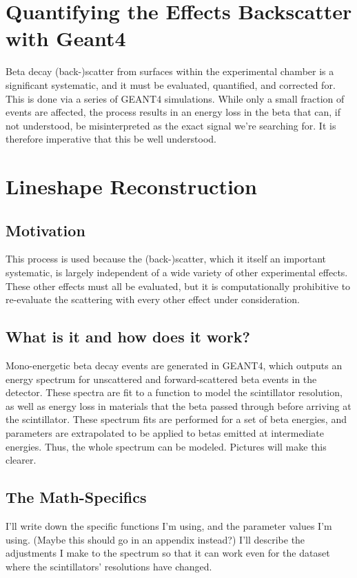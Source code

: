 \section{Quantifying the Effects Backscatter with Geant4}
	Beta decay (back-)scatter from surfaces within the experimental chamber is a significant systematic, and it must be evaluated, quantified, and corrected for.  This is done via a series of GEANT4 simulations.  While only a small fraction of events are affected, the process results in an energy loss in the beta that can, if not understood, be misinterpreted as the exact signal we're searching for.  It is therefore imperative that this be well understood. 

\section{Lineshape Reconstruction}
	\subsection{Motivation}
	This process is used because the (back-)scatter, which it itself an important systematic, is largely independent of a wide variety of other experimental effects.  These other effects must all be evaluated, but it is computationally prohibitive to re-evaluate the scattering with every other effect under consideration.
	
	\subsection{What is it and how does it work?}
	Mono-energetic beta decay events are generated in GEANT4, which outputs an energy spectrum for unscattered and forward-scattered beta events in the detector.  These spectra are fit to a function to model the scintillator resolution, as well as energy loss in materials that the beta passed through before arriving at the scintillator.  These spectrum fits are performed for a set of beta energies, and parameters are extrapolated to be applied to betas emitted at intermediate energies.  Thus, the whole spectrum can be modeled.  Pictures will make this clearer. 
	
	\subsection{The Math-Specifics}
	I'll write down the specific functions I'm using, and the parameter values I'm using.  (Maybe this should go in an appendix instead?)  I'll describe the adjustments I make to the spectrum so that it can work even for the dataset where the scintillators' resolutions have changed.
	
